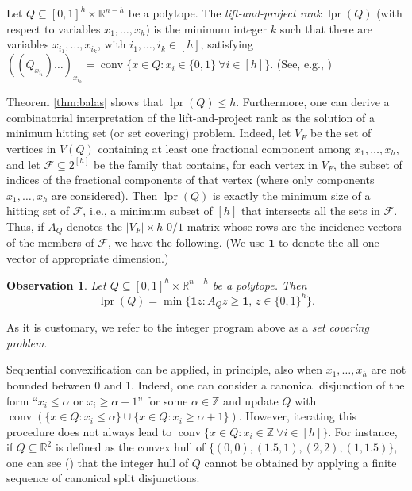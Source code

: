 \documentclass[11pt,a4paper]{article}
\newtheorem{observation}[theorem]{Observation}
\newcommand{\R}{\mathbb{R}}
\newcommand{\conv}{\operatorname{conv}}
\newcommand{\Z}{\mathbb{Z}}
\newcommand{\1}{\textbf{1}}
\newcommand{\lpr}{\operatorname{lpr}}
\newcommand\manuel[1]{\textcolor{LimeGreen}{\textbf{ MA:  #1}}}
\newcommand\michele[1]{\textcolor{blue}{\textbf{ MC:  #1}}}
\begin{document}
Let $Q\subseteq [0,1]^h\times \R^{n-h}$ be a polytope. The \emph{lift-and-project rank} $\lpr(Q)$ (with respect to variables $x_1,\dots,x_h$) is the minimum integer $k$ such that there are variables $x_{i_1},\dots, x_{i_k}$, with $i_1,\dots, i_k\in [h]$, satisfying $((Q_{x_{i_1}})\dots)_{ x_{i_k}}=\conv\{x\in Q : x_i\in \{0,1\}\:\forall i\in [h]\}$. (See, e.g., \cite[Section 5.4]{conforti2014integer})

Theorem \ref{thm:balas} shows that $\lpr(Q)\le h$. Furthermore,  one can derive a combinatorial interpretation of the lift-and-project rank as the solution of a minimum  hitting set (or set covering) problem.
Indeed, let $V_F$ be the set of vertices in $V(Q)$ containing at least one fractional component among $x_1,\dots,x_h$, and let $\mathcal{F}\subseteq 2^{[h]}$ be the family that contains, for each vertex in $V_F$, the subset of indices of the fractional components of that vertex (where only components $x_1,\dots,x_h$ are considered). 
Then $\lpr(Q)$ is exactly the minimum size of a hitting set of $\mathcal{F}$, i.e., a minimum subset of $[h]$ that intersects all the sets in $\mathcal F$. Thus, if $A_{Q}$ denotes the $|V_F|\times h$ $0/1$-matrix whose rows are the incidence vectors of the members of $\mathcal F$, we have the following. (We use $\mathbf1$ to denote the all-one vector of appropriate dimension.)



\begin{observation}\label{obs:set-covering}
Let $Q\subseteq [0,1]^h\times \R^{n-h}$ be a polytope.
Then $$\lpr(Q)=\min\{ \mathbf {1}z:A_{Q}z\ge \mathbf{1},\, z\in \{0,1\}^h\}.$$
\end{observation}

As it is customary, we refer to the integer program above as a \emph{set covering problem}.

Sequential convexification can be applied, in principle, also when $x_1,\dots,x_h$ are not bounded between 0 and 1. Indeed, one can consider a canonical disjunction of the form ``$x_i\le\alpha$ or $x_i\ge\alpha+1$'' for some $\alpha\in\Z$ and update $Q$ with $\conv(\{x\in Q:x_i\le\alpha\}\cup\{x\in Q:x_i\ge\alpha+1\})$. However, iterating this procedure does not always lead to $\conv\{x\in Q:x_i\in\Z\:\forall i\in[h]\}$. For instance, if $Q\subseteq \R^2$ is defined as the convex hull of $\{(0, 0),(1.5, 1),(2, 2),(1, 1.5)\}$, one can see (\cite[Theorem 2.4]{basu2020complexity}) that the integer hull of $Q$ cannot be obtained by applying a finite sequence of canonical split disjunctions.
\end{document}
